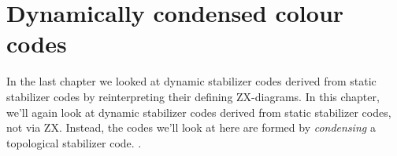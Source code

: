 \chapter{Dynamically condensed colour codes}\label{ch:dcccs}

In the last chapter we looked at dynamic stabilizer codes derived from static stabilizer codes by reinterpreting their defining ZX-diagrams.
In this chapter, we'll again look at dynamic stabilizer codes derived from static stabilizer codes, not via ZX.
Instead, the codes we'll look at here are formed by \textit{condensing} a topological stabilizer code.
.





